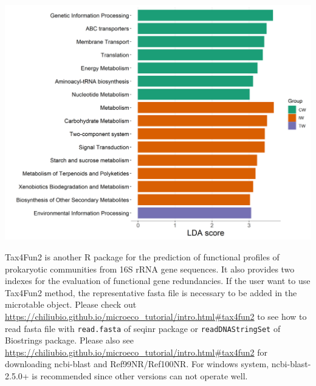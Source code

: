 \documentclass[
]{book}
\newenvironment{Shaded}{\begin{snugshade}}{\end{snugshade}}
\newcommand{\AttributeTok}[1]{\textcolor[rgb]{0.77,0.63,0.00}{#1}}
\newcommand{\ConstantTok}[1]{\textcolor[rgb]{0.00,0.00,0.00}{#1}}
\newcommand{\DecValTok}[1]{\textcolor[rgb]{0.00,0.00,0.81}{#1}}
\newcommand{\FloatTok}[1]{\textcolor[rgb]{0.00,0.00,0.81}{#1}}
\newcommand{\FunctionTok}[1]{\textcolor[rgb]{0.00,0.00,0.00}{#1}}
\newcommand{\NormalTok}[1]{#1}
\newcommand{\OtherTok}[1]{\textcolor[rgb]{0.56,0.35,0.01}{#1}}
\newcommand{\SpecialCharTok}[1]{\textcolor[rgb]{0.00,0.00,0.00}{#1}}
\newcommand{\StringTok}[1]{\textcolor[rgb]{0.31,0.60,0.02}{#1}}
\begin{document}
\begin{Shaded}
\end{Shaded}

\begin{center}\includegraphics[width=600px]{Images/plot_lefse_bar_tax4fun} \end{center}

Tax4Fun2 \citep{Wemheuer_Tax4Fun2_2020} is another R package for the prediction of functional profiles of prokaryotic communities from 16S rRNA gene sequences.
It also provides two indexes for the evaluation of functional gene redundancies.
If the user want to use Tax4Fun2 method, the representative fasta file is necessary to be added in the microtable object.
Please check out \url{https://chiliubio.github.io/microeco_tutorial/intro.html\#tax4fun2} to see
how to read fasta file with \texttt{read.fasta} of seqinr package or \texttt{readDNAStringSet} of Biostrings package.
Please also see \url{https://chiliubio.github.io/microeco_tutorial/intro.html\#tax4fun2} for downloading ncbi-blast and Ref99NR/Ref100NR.
For windows system, ncbi-blast-2.5.0+ is recommended since other versions can not operate well.
\end{document}
